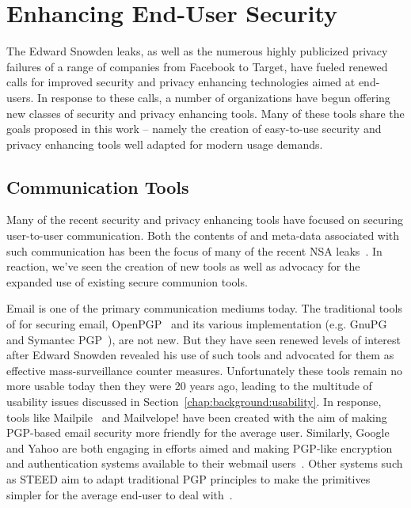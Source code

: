 \section{Enhancing End-User Security}
\label{chap:related:enduser}

The Edward Snowden leaks, as well as the numerous highly publicized
privacy failures of a range of companies from Facebook to Target, have
fueled renewed calls for improved security and privacy enhancing
technologies aimed at end-users. In response to these calls, a number
of organizations have begun offering new classes of security and privacy
enhancing tools. Many of these tools share the goals proposed in this
work -- namely the creation of easy-to-use security and privacy enhancing
tools well adapted for modern usage demands.

\subsection{Communication Tools}

Many of the recent security and privacy enhancing tools have focused
on securing user-to-user communication. Both the contents of and
meta-data associated with such communication has been the focus of
many of the recent NSA leaks~\cite{schneier-metadata}. In reaction,
we've seen the creation of new tools as well as advocacy for the
expanded use of existing secure communion tools.

Email is one of the primary communication mediums today. The
traditional tools of for securing email, OpenPGP~\cite{openpgp} and
its various implementation (e.g. GnuPG~\cite{gnupg} and Symantec
PGP~\cite{pgp}), are not new. But they have seen renewed levels of
interest after Edward Snowden revealed his use of such tools and
advocated for them as effective mass-surveillance counter
measures. Unfortunately these tools remain no more usable today then
they were 20 years ago, leading to the multitude of usability issues
discussed in Section~\ref{chap:background:usability}. In response,
tools like Mailpile~\cite{mailpile} and Mailvelope!\cite{mailvelope}
have been created with the aim of making PGP-based email security more
friendly for the average user. Similarly, Google and Yahoo are both
engaging in efforts aimed and making PGP-like encryption and
authentication systems available to their webmail
users~\cite{google-endtoend, yahoo-endtoend}. Other systems such as
STEED aim to adapt traditional PGP principles to make the primitives
simpler for the average end-user to deal with~\cite{koch2011}.

